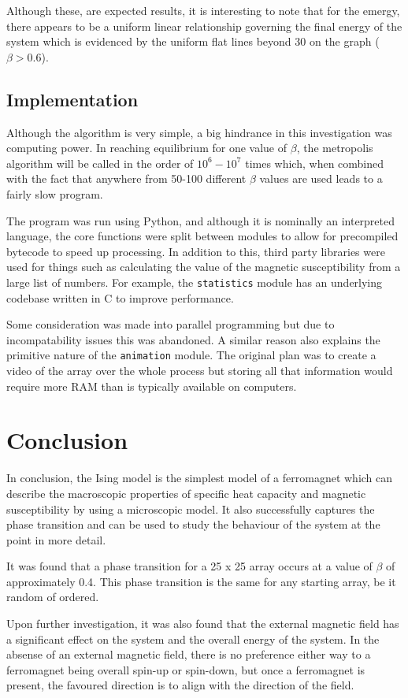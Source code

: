 \documentclass[11pt]{article}
\begin{document}
Although these, are expected results, it is interesting to note that for the emergy, there appears to be a uniform linear relationship governing the final energy of the system which is evidenced by the uniform flat lines beyond 30 on the graph ($\beta>0.6$).

\subsection*{Implementation}
Although the algorithm is very simple, a big hindrance in this investigation was computing power. In reaching equilibrium for one value of $\beta$, the metropolis algorithm will be called in the order of $10^{6}-10^{7}$ times which, when combined with the fact that anywhere from 50-100 different $\beta$ values are used leads to a fairly slow program.

The program was run using Python, and although it is nominally an interpreted language, the core functions were split between modules to allow for precompiled bytecode to speed up processing. In addition to this, third party libraries were used for things such as calculating the value of the magnetic susceptibility from a large list of numbers. For example, the \texttt{statistics} module has an underlying codebase written in C to improve performance.

Some consideration was made into parallel programming but due to incompatability issues this was abandoned. A similar reason also explains the primitive nature of the \texttt{animation} module. The original plan was to create a video of the array over the whole process but storing all that information would require more RAM than is typically available on computers.
 
\section*{Conclusion}
In conclusion, the Ising model is the simplest model of a ferromagnet which can describe the macroscopic properties of specific heat capacity and magnetic susceptibility by using a microscopic model. It also successfully captures the phase transition and can be used to study the behaviour of the system at the point in more detail.

It was found that a phase transition for a 25 x 25 array occurs at a value of $\beta$ of approximately 0.4. This phase transition is the same for any starting array, be it random of ordered.

Upon further investigation, it was also found that the external magnetic field has a significant effect on the system and the overall energy of the system. In the absense of an external magnetic field, there is no preference either way to a ferromagnet being overall spin-up or spin-down, but once a ferromagnet is present, the favoured direction is to align with the direction of the field.
\end{document}
